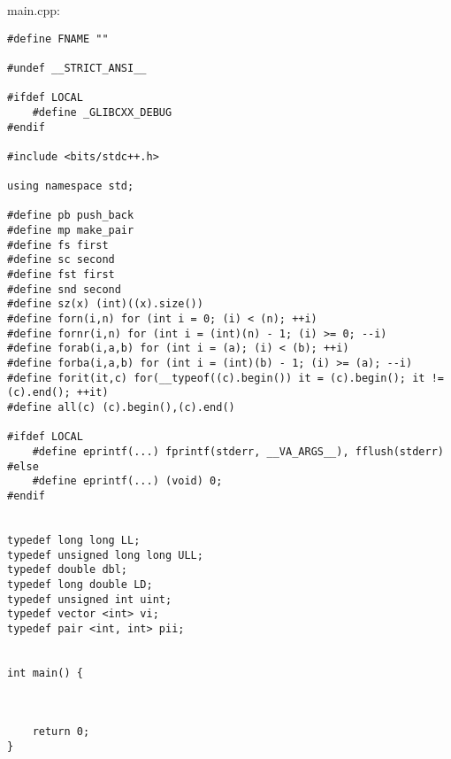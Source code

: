 main.cpp:
\begin{verbatim}
#define FNAME ""

#undef __STRICT_ANSI__

#ifdef LOCAL
	#define _GLIBCXX_DEBUG
#endif

#include <bits/stdc++.h> 

using namespace std;

#define pb push_back
#define mp make_pair
#define fs first
#define sc second
#define fst first
#define snd second
#define sz(x) (int)((x).size()) 
#define forn(i,n) for (int i = 0; (i) < (n); ++i)
#define fornr(i,n) for (int i = (int)(n) - 1; (i) >= 0; --i)
#define forab(i,a,b) for (int i = (a); (i) < (b); ++i)
#define forba(i,a,b) for (int i = (int)(b) - 1; (i) >= (a); --i)
#define forit(it,c) for(__typeof((c).begin()) it = (c).begin(); it != (c).end(); ++it)
#define all(c) (c).begin(),(c).end()

#ifdef LOCAL
	#define eprintf(...) fprintf(stderr, __VA_ARGS__), fflush(stderr)
#else
	#define eprintf(...) (void) 0;   
#endif


typedef long long LL;
typedef unsigned long long ULL;
typedef double dbl;
typedef long double LD;
typedef unsigned int uint;
typedef vector <int> vi;
typedef pair <int, int> pii;


int main() {
	
	

	return 0;
}
\end{verbatim}
